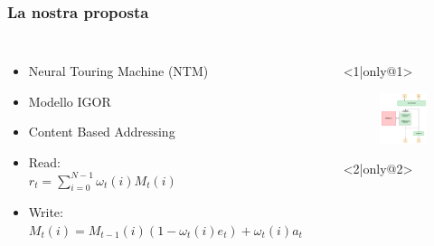 \documentclass{beamer}
\begin{document}
\begin{frame}
\frametitle{La nostra proposta}
\begin{columns}
\begin{itemize} 
\item <1-> Neural Touring Machine (NTM)
\item <2-> Modello IGOR
\item <3-> Content Based Addressing
\item <4-> Read:\\ \footnotesize	 $r_{t}=\sum_{i=0}^{N-1}\omega_{t}(i)M_{t}(i)$
\item <5-> Write:\\ \scriptsize $M_{t}(i)=M_{t-1}(i)(1-\omega_{t}(i)e_{t})+\omega_{t}(i)a_{t}$

\end{itemize}
\begin{itemize}
	\item[] <1|only@1> 
		\begin{figure}[!h]
 			\begin{center}
 			\includegraphics[scale=0.22]{"Immagini/NTM.png"}
 			\end{center}
 		\end{figure}
 	\item[] <2|only@2> 

\end{itemize}
\end{columns}
\end{frame}
\end{document}
